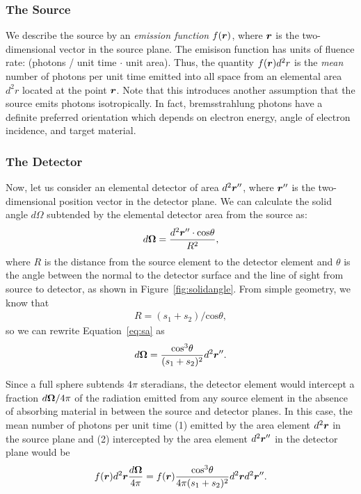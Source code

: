 \documentclass[mphy386-notes.tex]{subfiles}
\begin{document}
\subsubsection{The Source}

We describe the source by an \textit{emission function} $f(\boldsymbol{r})$, where
$\boldsymbol{r}$ is the two-dimensional vector in the source plane. The emisison
function has units of fluence rate: (photons / unit time $\cdot$ unit
area). Thus, the quantity $f(\boldsymbol{r})d^2 r$ is the \textit{mean} number of
photons per unit time emitted into all space from an elemental area $d^2 r$
located at the point $\boldsymbol{r}$. Note that this introduces another assumption that
the source emits photons isotropically. In fact, bremsstrahlung photons have
a definite preferred orientation which depends on electron energy, angle of
electron incidence, and target material.


\subsubsection{The Detector}

Now, let us consider an elemental detector of area $d^2\boldsymbol{r}''$, where
$\boldsymbol{r}''$ is the two-dimensional position vector in the detector plane.
We can calculate the solid angle $d\Omega$ subtended by the elemental
detector area from the source as:
\begin{align}
  d\boldsymbol{\Omega} = \frac{d^2\boldsymbol{r}''\cdot\text{cos}\theta}{R^2},
  \label{eq:sa}
\end{align}
where $R$ is the distance from the source element to the detector element and
$\theta$ is the angle between the normal to the detector surface and the line of
sight from source to detector, as shown in Figure~\ref{fig:solidangle}. From
simple geometry, we know that
\begin{align}
  R = (s_1 + s_2) / \text{cos}\theta,
\end{align}
so we can rewrite Equation~\ref{eq:sa} as
\begin{align}
  d\boldsymbol{\Omega} = \frac{\text{cos}^3\theta}{(s_1 + s_2)^2}d^2\boldsymbol{r}''.
\end{align}

Since a full sphere subtends $4\pi$ steradians, the detector element would
intercept a fraction $d\boldsymbol{\Omega}/4\pi$ of the radiation emitted from
any source element in the absence of absorbing material in between
the source and detector planes. In this case, the mean number of
photons per unit time (1) emitted by the area element $d^2\boldsymbol{r}$ in the source
plane and (2) intercepted by the area element $d^2\boldsymbol{r}''$ in the detector
plane would be
\begin{align}
  f(\boldsymbol{r})d^2\boldsymbol{r}\frac{d\boldsymbol{\Omega}}{4\pi} = f(\boldsymbol{r})\frac{\text{cos}^3\theta}{4\pi(s_1+s_2)^2}d^2\boldsymbol{r}d^2\boldsymbol{r}''.
\end{align}
\end{document}
